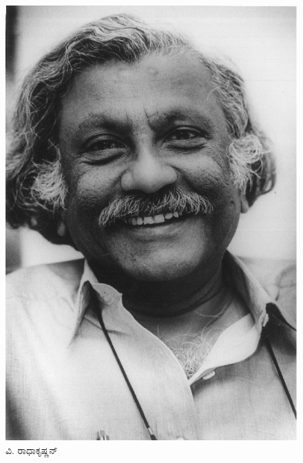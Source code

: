 \begin{figure}[!htpb]
\centering
\includegraphics[scale=0.24]{"images/18.jpg"}
\caption{ವಿ. ರಾಧಾಕೃಷ್ಣನ್}\label{chap5-fig03}
\end{figure}


